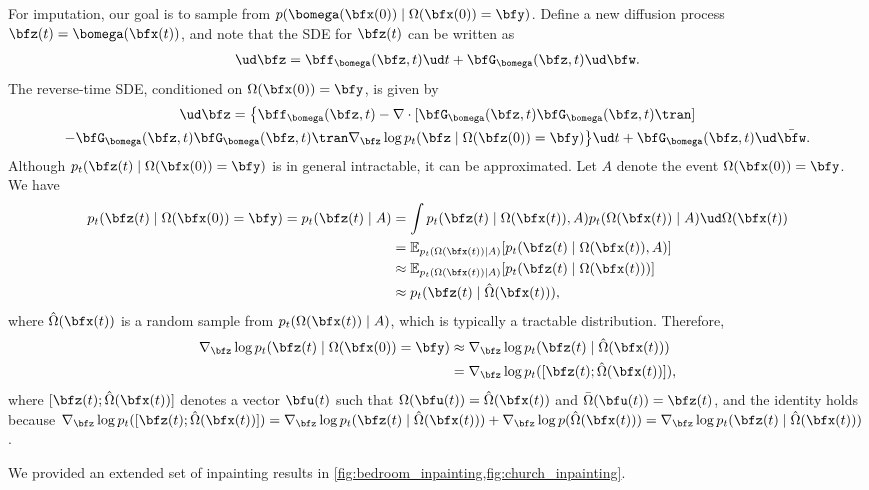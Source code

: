For imputation, our goal is to sample from $p(\bomega(\bfx(0)) \mid \Omega(\bfx(0)) = \bfy)$. Define a new diffusion process $\bfz(t) = \bomega(\bfx(t))$, and note that the SDE for $\bfz(t)$ can be written as
\begin{align*}
\ud \bfz = \bff_\bomega(\bfz, t) \ud t + \bfG_\bomega(\bfz, t) \ud \bfw.
\end{align*}
The reverse-time SDE, conditioned on $\Omega(\bfx(0)) = \bfy$, is given by
\begin{multline*}
\ud\bfz = \big\{\bff_\bomega(\bfz, t) - \nabla \cdot [\bfG_{\bomega}(\bfz, t) \bfG_{\bomega}(\bfz,t)\tran] \\- \bfG_\bomega(\bfz, t)\bfG_\bomega(\bfz, t)\tran \nabla_\bfz \log p_t(\bfz \mid \Omega(\bfz(0)) = \bfy)\big\}\ud t + \bfG_\bomega(\bfz, t)\ud\bar{\bfw}.
\end{multline*}
Although $p_t(\bfz(t) \mid \Omega(\bfx(0)) = \bfy)$ is in general intractable, it can be approximated. Let $A$ denote the event $\Omega(\bfx(0)) = \bfy $. We have
\begin{align*}
p_t(\bfz(t) \mid \Omega(\bfx(0)) = \bfy) = p_t(\bfz(t) \mid A) &= \int p_t(\bfz(t) \mid \Omega(\bfx(t)), A) p_t(\Omega(\bfx(t)) \mid A) \ud \Omega(\bfx(t)) \\
&= \mathbb{E}_{p_t(\Omega(\bfx(t)) \mid A)}[p_t(\bfz(t) \mid \Omega(\bfx(t)), A)]\\
&\approx \mathbb{E}_{p_t(\Omega(\bfx(t)) \mid A)}[p_t(\bfz(t) \mid \Omega(\bfx(t)))]\\
&\approx p_t(\bfz(t) \mid \hat{\Omega}(\bfx(t))),
\end{align*}
where $\hat{\Omega}(\bfx(t))$ is a random sample from $p_t(\Omega(\bfx(t)) \mid A)$, which is typically a tractable distribution. Therefore,
\begin{align*}
\nabla_\bfz \log p_t(\bfz(t) \mid \Omega(\bfx(0))=\bfy) &\approx \nabla_\bfz \log p_t(\bfz(t) \mid \hat{\Omega}(\bfx(t))) \\
&= \nabla_\bfz \log p_t([\bfz(t); \hat{\Omega}(\bfx(t))]),
\end{align*}
where $[\bfz(t); \hat{\Omega}(\bfx(t))]$ denotes a vector $\bfu(t)$ such that $\Omega(\bfu(t)) = \hat{\Omega}(\bfx(t))$ and $\bar{\Omega}(\bfu(t)) = \bfz(t)$, and the identity holds because $\nabla_\bfz \log p_t([\bfz(t); \hat{\Omega}(\bfx(t))]) = \nabla_\bfz \log p_t(\bfz(t) \mid \hat{\Omega}(\bfx(t))) + \nabla_\bfz \log p(\hat{\Omega}(\bfx(t))) = \nabla_\bfz \log p_t(\bfz(t) \mid \hat{\Omega}(\bfx(t)))$.

We provided an extended set of inpainting results in \cref{fig:bedroom_inpainting,fig:church_inpainting}.

